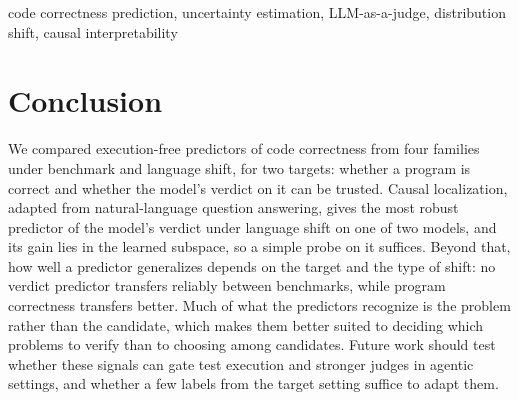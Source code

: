 \documentclass[10pt,conference]{IEEEtran}
\begin{document}
\begin{IEEEkeywords}
code correctness prediction, uncertainty estimation, LLM-as-a-judge, distribution shift, causal interpretability
\end{IEEEkeywords}




















\section{Conclusion}
\label{sec:conclusion}
We compared execution-free predictors of code correctness from four families
under benchmark and language shift, for two targets: whether a program is
correct and whether the model's verdict on it can be trusted. Causal
localization, adapted from natural-language question answering, gives the
most robust predictor of the model's verdict under language shift on one of
two models, and its gain lies in the learned subspace, so a simple probe on it
suffices. 
Beyond that, how well a predictor generalizes depends on the target
and the type of shift: no verdict predictor transfers reliably between
benchmarks, while program correctness transfers better. Much of what the predictors
recognize is the problem rather than the candidate, which makes them better suited to deciding which problems to verify than to choosing among candidates. 
Future work should test whether these signals can gate test execution and stronger judges in agentic settings, and whether a few labels from the target setting suffice to adapt them. %






\end{document}
